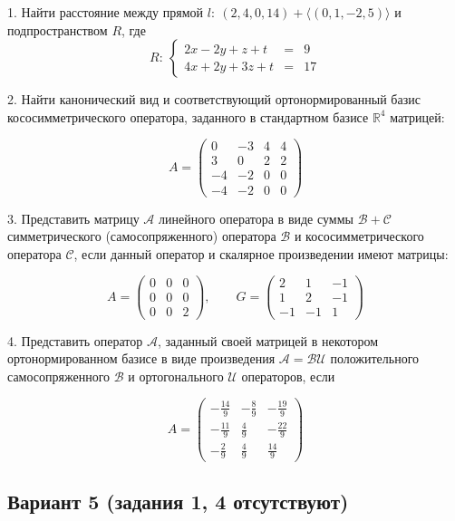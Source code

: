\documentclass[a4paper]{article}
\begin{document}
1. Найти расстояние между прямой $l:\ (2, 4, 0, 14)+\langle(0, 1,
-2, 5)\rangle$ и подпространством $R$, где
$$
R:\ \left\{
\begin{array}{lcr}
2x-2y+z+t & = & 9 \\
4x+2y+3z+t & = & 17

\end{array} \right.
$$

2. Найти канонический вид и соответствующий ортонормированный
базис кососимметрического оператора, заданного в стандартном
базисе $\mathbb{R}^4$ матрицей:

$$ A= \left(
\begin{array}{cccc}
0 & -3 & 4 & 4\\
3 & 0 & 2 & 2 \\
-4 & -2 & 0 & 0 \\
-4 & -2 & 0 & 0
\end{array} \right)  $$

3. Представить матрицу $\mathcal{A}$ линейного оператора в виде
суммы $\mathcal{B+C}$ симметрического (самосопряженного) оператора
$\mathcal{B}$ и кососимметрического оператора $\mathcal{C}$, если
данный оператор и скалярное произведении имеют матрицы:

$$ A= \left(
\begin{array}{rrr}
0 & 0 & 0 \\
0 & 0 & 0  \\
0 & 0 & 2
\end{array} \right)  ,\qquad G=
\left(
\begin{array}{rrr}
2& 1 & -1\\
1 & 2 & -1 \\
-1 & -1 & 1
\end{array} \right)  $$


4. Представить оператор $\mathcal{A}$, заданный своей матрицей в
некотором ортонормированном базисе в виде произведения
$\mathcal{A=BU}$ положительного самосопряженного $\mathcal{B}$ и
ортогонального $\mathcal{U}$ операторов, если

$$ A= \left(
\begin{array}{rrr}
-\frac{14}{9} & -\frac{8}{9} & -\frac{19}{9}\\
-\frac{11}{9} & \frac{4}{9} & -\frac{22}{9} \\
-\frac{2}{9} & \frac{4}{9} & \frac{14}{9}
\end{array} \right)  $$

\subsection{Вариант 5 (задания 1, 4 отсутствуют)}
\end{document}
